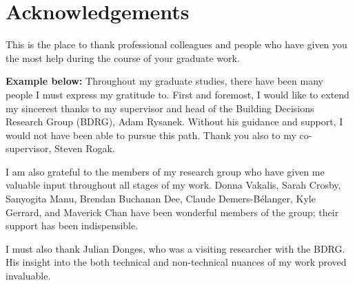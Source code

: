 \chapter{Acknowledgements}
This is the place to thank professional colleagues and people who have given
you the most help during the course of your graduate work.

\textbf{Example below:}
Throughout my graduate studies, there have been many people I must express my gratitude to. First and foremost, I would like to extend my sincerest thanks to my supervisor and head of the Building Decisions Research Group (BDRG), Adam Rysanek. Without his guidance and support, I would not have been able to pursue this path. Thank you also to my co-supervisor, Steven Rogak.

I am also grateful to the members of my research group who have given me
valuable input throughout all stages of my work. Donna Vakalis, Sarah Crosby,
Sanyogita Manu, Brendan Buchanan Dee, Claude Demers-Bélanger, Kyle Gerrard, and
Maverick Chan have been wonderful members of the group; their support has been
indispensible.

I must also thank Julian Donges, who was a visiting researcher with the BDRG.
His insight into the both technical and non-technical nuances of my work proved
invaluable.